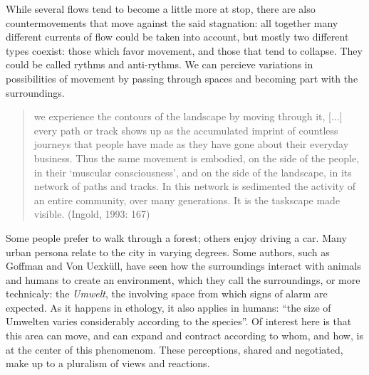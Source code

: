 While several flows tend to become a little more at stop,
there are also countermovements that move against the said stagnation:
all together many different currents of flow could be taken into account, but mostly two different types coexist:
those which favor movement, and those that tend to collapse. They could be called rythms and anti-rythms.
We can percieve %
variations in possibilities of movement by passing through spaces and becoming part with the surroundings.

\begin{quote}
we experience the contours of the landscape by moving through it,
[...]
every path or track shows up as the accumulated imprint of countless journeys that people have made 
as they have gone about their everyday business. Thus the same movement is embodied, on the side of the people, in their `muscular consciousness', and on the side of the landscape, in its network of paths and tracks. In this network is sedimented the activity of an entire community, over many generations. It is the taskscape made visible. (Ingold, 1993: 167)
\end{quote}

Some people prefer to walk through a forest; others enjoy driving a car.
%
Many urban persona relate to the city in varying degrees. Some authors, such as Goffman and Von Uexküll, have 
seen how %
the surroundings interact with animals and humans to %
create an environment, which they call the surroundings, or more technicaly: the \textit{Umwelt}, 
the involving space from which signs of alarm are expected. 
As it happens in ethology, it also applies in humans: ``the size of Umwelten
varies considerably according to the species''. Of interest here is that
this area can move, and can expand and contract according to whom, and how, is at the
center of this phenomenom. These perceptions, shared and negotiated, make
up to a pluralism of views and reactions. 

